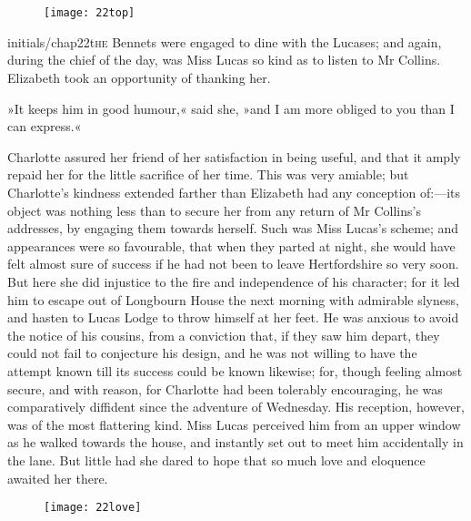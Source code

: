\chapter[Chapter \thechapter]{}
\begin{figure}[t!]
\centering
\texttt{[image: 22top]}
\end{figure}


\lettrine[lines=6,image=true]{initials/chap22t}{he} Bennets were engaged to dine with the Lucases; and again, during the chief of the day, was Miss Lucas so kind as to listen to Mr Collins. Elizabeth took an opportunity of thanking her. 

\zz
»It keeps him in good humour,« said she, »and I am more obliged to you than I can express.«

\zz
Charlotte assured her friend of her satisfaction in being useful, and that it amply repaid her for the little sacrifice of her time. This was very amiable; but Charlotte's kindness extended farther than Elizabeth had any conception of:—its object was nothing less than to secure her from any return of Mr Collins's addresses, by engaging them towards herself. Such was Miss Lucas's scheme; and appearances were so favourable, that when they parted at night, she would have felt almost sure of success if he had not been to leave Hertfordshire so very soon. But here she did injustice to the fire and independence of his character; for it led him to escape out of Longbourn House the next morning with admirable slyness, and hasten to Lucas Lodge to throw himself at her feet. He was anxious to avoid the notice of his cousins, from a conviction that, if they saw him depart, they could not fail to conjecture his design, and he was not willing to have the attempt known till its success could be known likewise; for, though feeling almost secure, and with reason, for Charlotte had been tolerably encouraging, he was comparatively diffident since the adventure of Wednesday. His reception, however, was of the most flattering kind. Miss Lucas perceived him from an upper window as he walked towards the house, and instantly set out to meet him accidentally in the lane. But little had she dared to hope that so much love and eloquence awaited her there.

\begin{figure}[tbh!]
\centering
\texttt{[image: 22love]}
\end{figure}

